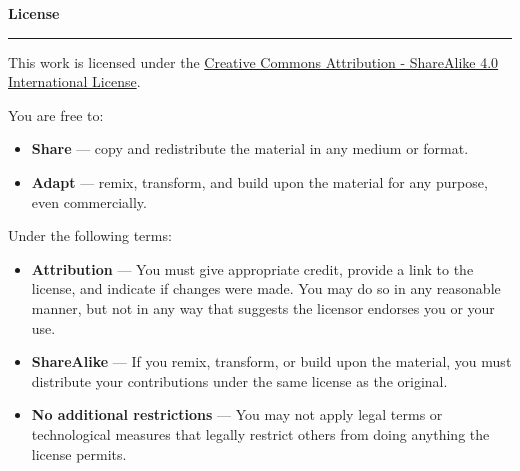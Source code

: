 % 
% 
% 
% 
% 

\thispagestyle{empty}

\hfill

\vfill

\textbf{License} \ccbysa
\par\vspace*{\dimexpr-\parskip-\baselineskip+6pt}
\noindent\rule{\textwidth}{0.5pt}


This work is licensed under the \hyperlink{https://creativecommons.org/licenses/by-sa/4.0/legalcode}{Creative Commons Attribution - ShareAlike 4.0 International License}.

You are free to:
\begin{itemize}
	\item[] \textbf{Share} --- copy and redistribute the material in any medium or format.
	\item[] \textbf{Adapt} --- remix, transform, and build upon the material for any purpose, even commercially.
\end{itemize}

Under the following terms:
\begin{itemize}
	\item[\ccAttribution] \textbf{Attribution} --- You must give appropriate credit, provide a link to the license, and indicate if changes were made. You may do so in any reasonable manner, but not in any way that suggests the licensor endorses you or your use. 
	\item[\ccShareAlike] \textbf{ShareAlike} --- If you remix, transform, or build upon the material, you must distribute your contributions under the same license as the original.
	\item[] \textbf{No additional restrictions} --- You may not apply legal terms or technological measures that legally restrict others from doing anything the license permits.
\end{itemize}
\clearpage
